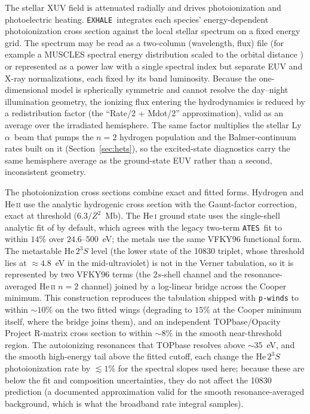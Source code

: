 \documentclass[twocolumn]{aastex702}
\newcommand{\EXHALE}{\texttt{EXHALE}}
\newcommand{\ATES}{\texttt{ATES}}
\newcommand{\HeTS}{\mathrm{He}\,2^{3}S}
\newcommand{\Lya}{\mbox{Ly}\ensuremath{\alpha}}
\begin{document}
The stellar XUV field is attenuated radially and drives photoionization and
photoelectric heating. \EXHALE\ integrates each species' energy-dependent
photoionization cross section against the local stellar spectrum on a fixed energy grid.
The spectrum may be read as a two-column (wavelength, flux) file (for example a
MUSCLES spectral energy distribution scaled to the orbital distance \citep{France2016})
or represented as a power law with a single spectral index but separate EUV and X-ray
normalizations, each fixed by its band luminosity. Because the one-dimensional model is
spherically symmetric and cannot resolve the day--night illumination geometry, the
ionizing flux entering the hydrodynamics is reduced by a redistribution factor (the
``Rate/2 + Mdot/2'' approximation), valid as an average over the irradiated hemisphere.
The same factor multiplies the stellar \Lya\ beam that pumps the $n=2$ hydrogen
population and the Balmer-continuum rates built on it (Section~\ref{sec:hets}), so the
excited-state diagnostics carry the same hemisphere average as the ground-state EUV
rather than a second, inconsistent geometry.

The photoionization cross sections combine exact and fitted forms. Hydrogen and
\mbox{He\,\textsc{ii}} use the analytic hydrogenic cross section with the Gaunt-factor
correction, exact at threshold ($6.3/Z^2$~Mb). The \mbox{He\,\textsc{i}} ground state
uses the single-shell analytic fit of \citet[VFKY96]{Verner1996} by default, which agrees
with the legacy two-term \ATES\ fit to within $14\%$ over $24.6$--$500$~eV; the metals
use the same VFKY96 functional form. The metastable $\HeTS$
level (the lower state of the 10830 triplet, whose threshold lies at $\approx4.8$~eV in
the mid-ultraviolet) is not in the Verner tabulation, so it is represented by two VFKY96
terms (the $2s$-shell channel and the resonance-averaged \mbox{He\,\textsc{ii}} $n=2$
channel) joined by a log-linear bridge across the Cooper minimum. This construction
reproduces the \citet{Norcross1971} tabulation shipped with \texttt{p-winds}
\citep{dosSantos2022} to within $\sim10\%$ on the two fitted wings (degrading to
$15\%$ at the Cooper minimum itself, where the bridge joins them), and an independent
TOPbase/Opacity Project R-matrix cross section to within $\sim8\%$ in the smooth
near-threshold region. The
autoionizing resonances that TOPbase resolves above $\sim35$~eV, and the smooth
high-energy tail above the fitted cutoff, each change the $\HeTS$ photoionization rate by
$\lesssim1\%$ for the spectral slopes used here; because these are below the fit and
composition uncertainties, they do
not affect the 10830 prediction (a documented approximation valid for the smooth
resonance-averaged background, which is what the broadband rate integral samples).
\end{document}
